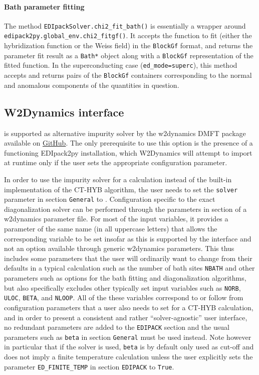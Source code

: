 \documentclass[edipack2.tex]{subfiles}
\begin{document}
\paragraph{{\bf Bath parameter fitting}}
The method {\tt EDIpackSolver.chi2\_fit\_bath()} is essentially a wrapper around
{\tt edipack2py.global\_env.chi2\_fitgf()}. It accepts the function to fit (either
the hybridization function or the Weiss field) in the {\tt BlockGf} format,
and returns the parameter fit result as a {\tt Bath*} object along with a
{\tt BlockGf} representation of the fitted function. In the superconducting
case ({\tt ed\_mode=superc}), this method accepts and returns pairs of
the {\tt BlockGf} containers corresponding to the normal and anomalous 
components of the quantities in question.

\subsection{W2Dynamics interface}\label{sSecInteropW2DYN}
\NAME is supported as alternative impurity solver by the w2dynamics DMFT package~\cite{Wallerberger2019CPC} available on \href{https://github.com/w2dynamics/w2dynamics}{GitHub}. The only prerequisite to use this option is the presence of a functioning EDIpack2py installation, which W2Dynamics will attempt to import at runtime only if the user sets the appropriate configuration parameter.

In order to use the \NAME impurity solver for a calculation instead of the built-in implementation of the CT-HYB algorithm, the user needs to set the {\tt solver} parameter in section {\tt General} to \NAME. Configuration specific to the exact diagonalization solver can be performed through the parameters in section \NAME of a w2dynamics parameter file. For most of the \NAME input variables, it provides a parameter of the same name (in all uppercase letters) that allows the corresponding variable to be set insofar as this is supported by the interface and not an option available through generic w2dynamics parameters. This thus includes some parameters that the user will ordinarily want to change from their defaults in a typical calculation such as the number of bath sites {\tt NBATH} and other parameters such as options for the bath fitting and diagonalization algorithms, but also specifically excludes other typically set input variables such as {\tt NORB}, {\tt ULOC}, {\tt BETA}, and {\tt   NLOOP}. All of the these variables correspond to or follow from configuration parameters that a user also needs to set for a CT-HYB calculation, and in order to present a consistent and rather ``solver-agnostic'' user interface, no redundant parameters are added to the {\tt EDIPACK} section and the usual parameters such as {\tt   beta} in section {\tt General} must be used instead. Note however in particular that if the \NAME solver is used, {\tt beta} is by default only used as cut-off and does not imply a finite temperature calculation unless the user explicitly sets the parameter {\tt   ED\_FINITE\_TEMP} in section {\tt EDIPACK} to {\tt True}.
\end{document}
